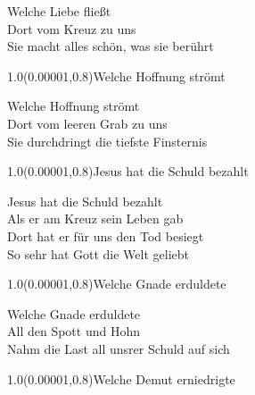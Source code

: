 \documentclass[aspectratio=169]{beamer}
\begin{document}
\color{white}
\begin{frame}
\centering
\color{white}
\huge{Welche Liebe fließt} \\
\huge{Dort vom Kreuz zu uns} \\
\huge{Sie macht alles schön, was sie berührt} \\

\begin{textblock}{1.0}(0.00001,0.8)\color{gray}\normalsize{Welche Hoffnung strömt}\end{textblock}
\end{frame}

\begin{frame}
\centering
\color{white}
\huge{Welche Hoffnung strömt} \\
\huge{Dort vom leeren Grab zu uns} \\
\huge{Sie durchdringt die tiefste Finsternis} \\

\begin{textblock}{1.0}(0.00001,0.8)\color{gray}\normalsize{Jesus hat die Schuld bezahlt}\end{textblock}
\end{frame}

\begin{frame}
\centering
\color{white}
\huge{Jesus hat die Schuld bezahlt} \\
\huge{Als er am Kreuz sein Leben gab} \\
\huge{Dort hat er für uns den Tod besiegt} \\
\huge{So sehr hat Gott die Welt geliebt} \\

\begin{textblock}{1.0}(0.00001,0.8)\color{gray}\normalsize{Welche Gnade erduldete}\end{textblock}
\end{frame}

\begin{frame}
\centering
\color{white}
\huge{Welche Gnade erduldete} \\
\huge{All den Spott und Hohn} \\
\huge{Nahm die Last all unsrer Schuld auf sich} \\

\begin{textblock}{1.0}(0.00001,0.8)\color{gray}\normalsize{Welche Demut erniedrigte}\end{textblock}
\end{frame}
\end{document}
